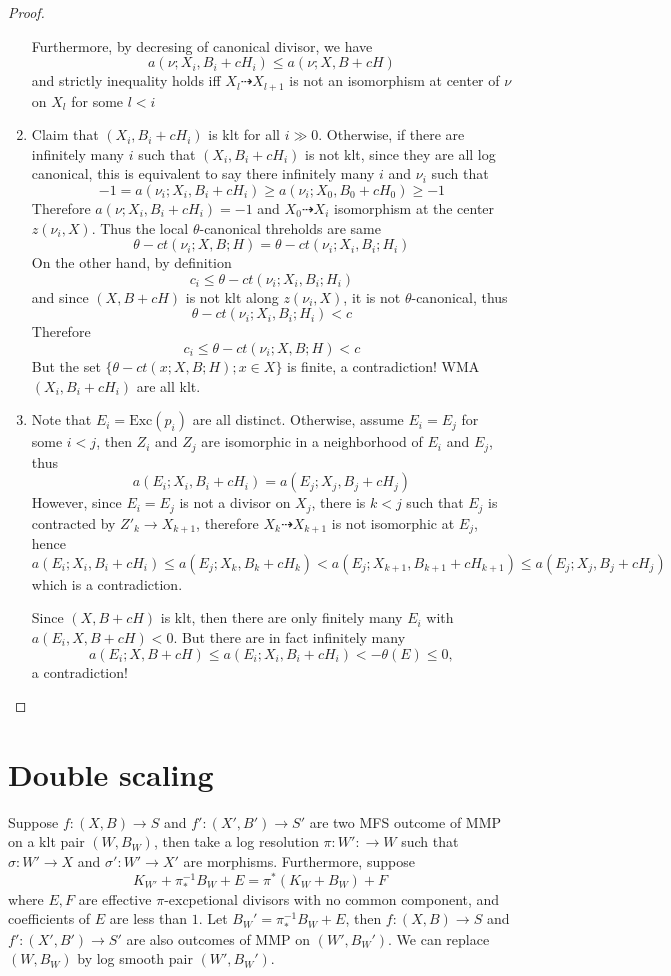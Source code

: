 \documentclass{article}
\begin{document}
\begin{proof}
\begin{enumerate}[Step 1]
    Furthermore, by decresing of canonical divisor, we have
    $$ a(\nu;X_i,B_i+cH_i)\leqslant a(\nu;X,B+cH) $$
    and strictly inequality holds iff $ X_l\dashrightarrow X_{l+1} $ is not an isomorphism at center of $ \nu $ on $ X_l $ for some $ l<i $
    \item Claim that $ (X_i,B_i+cH_i) $ is klt for all $ i\gg 0 $. Otherwise, if there are infinitely many $ i $ such that $ (X_i,B_i+cH_i) $ is not klt, since they are all log canonical, this is equivalent to say there infinitely many $ i $ and $ \nu_i $ such that
    $$ -1=a(\nu_i;X_i,B_i+cH_i)\geqslant a(\nu_i;X_0,B_0+cH_0)\geqslant -1  $$
    Therefore $ a(\nu;X_i,B_i+cH_i)=-1 $ and $ X_0\dashrightarrow X_i $ isomorphism at the center $ z(\nu_i,X) $. Thus the local $ \theta $-canonical threholds are same
    $$ \theta-ct(\nu_i;X,B;H)=\theta-ct(\nu_i;X_i,B_i;H_i) $$
    On the other hand, by definition
    $$ c_i \leqslant \theta-ct(\nu_i;X_i,B_i;H_i) $$
    and since $ (X,B+cH) $ is not klt along $ z(\nu_i,X) $, it is not $ \theta $-canonical, thus
    $$ \theta-ct(\nu_i;X_i,B_i;H_i)<c $$
    Therefore
    $$ c_i\leqslant \theta-ct(\nu_i;X,B;H)<c $$
    But the set $\{ \theta-ct(x;X,B;H);x\in X\} $ is finite, a contradiction! WMA $ (X_i,B_i+cH_i) $ are all klt.
    \item Note that $ E_i=\mathrm{Exc}(p_i) $ are all distinct. Otherwise, assume $ E_i=E_j $ for some $ i<j $, then $ Z_i $ and $ Z_j $ are isomorphic in a neighborhood of $ E_i $ and $ E_j $, thus 
    $$ a(E_i;X_i,B_i+cH_i)=a(E_j;X_j,B_j+cH_j) $$
    However, since $ E_i=E_j $ is not a divisor on $ X_j $, there is $ k<j $ such that $ E_j $ is contracted by $ Z'_k\to X_{k+1} $, therefore $ X_k\dashrightarrow X_{k+1} $ is not isomorphic at $ E_j $, hence 
    $$ a(E_i;X_i,B_i+cH_i)\leqslant a(E_j;X_k,B_k+cH_k)<a(E_j;X_{k+1},B_{k+1}+cH_{k+1})\leqslant a(E_j;X_j,B_j+cH_j) $$  
    which is a contradiction.
    
    Since $ (X,B+cH) $ is klt, then there are only finitely many $ E_i $ with $ a(E_i,X,B+cH)<0 $. But there are in fact infinitely many
    $$ a(E_i;X,B+cH)\leqslant  a(E_i;X_i,B_i+cH_i)<-\theta (E)\leqslant 0 ,$$ 
    a contradiction! 
  \end{enumerate}
\end{proof}

\section{Double scaling}
Suppose $ f:(X,B)\to S $ and $ f':(X',B')\to S' $ are two MFS outcome of MMP on a klt pair $ (W,B_W) $, then take a log resolution $ \pi:W':\to W $ such that $ \sigma:W'\to X $ and $ \sigma':W'\to X' $ are morphisms. Furthermore, suppose
$$ K_{W'}+\pi_*^{-1}B_W+E=\pi^*(K_W+B_W)+F $$
where $ E,F $ are effective $ \pi $-excpetional divisors with no common component, and coefficients of $ E $ are less than $ 1 $. Let $ B_W'=\pi_*^{-1}B_W+E $, then $ f:(X,B)\to S $ and $ f':(X',B')\to S' $ are also  outcomes of MMP on $ (W',B_W') $. We can replace $ (W,B_W) $ by log smooth pair $ (W',B_W') $. 
\end{document}
